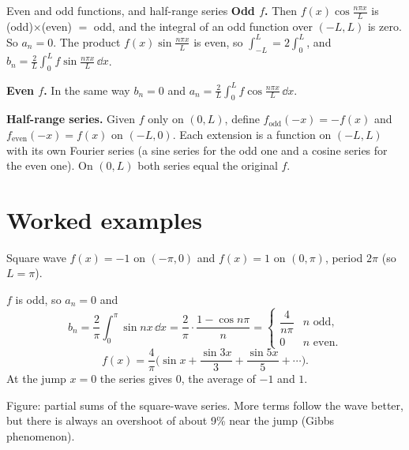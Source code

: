 \begin{derivbox}{Even and odd functions, and half-range series}
\textbf{Odd $f$.} Then $f(x)\cos\frac{n\pi x}{L}$ is (odd)$\times$(even) $=$ odd, and the integral of an odd function over $(-L,L)$ is zero. So $a_n = 0$. The product $f(x)\sin\frac{n\pi x}{L}$ is even, so $\int_{-L}^{L} = 2\int_0^L$, and $b_n = \frac2L\int_0^Lf\sin\frac{n\pi x}{L}\,\dd x$.

\textbf{Even $f$.} In the same way $b_n = 0$ and $a_n = \frac2L\int_0^Lf\cos\frac{n\pi x}{L}\,\dd x$.

\textbf{Half-range series.} Given $f$ only on $(0,L)$, define $f_{\text{odd}}(-x) = -f(x)$ and $f_{\text{even}}(-x) = f(x)$ on $(-L,0)$. Each extension is a function on $(-L,L)$ with its own Fourier series (a sine series for the odd one and a cosine series for the even one). On $(0,L)$ both series equal the original $f$.
\end{derivbox}

\section{Worked examples}

\begin{examplebox}{Square wave}
$f(x) = -1$ on $(-\pi, 0)$ and $f(x)=1$ on $(0,\pi)$, period $2\pi$ (so $L=\pi$).

$f$ is odd, so $a_n = 0$ and
\[ b_n = \frac2\pi\int_0^\pi \sin nx\,\dd x = \frac{2}{\pi}\cdot\frac{1 - \cos n\pi}{n} = \begin{cases}\dfrac{4}{n\pi} & n \text{ odd},\\[4pt] 0 & n\text{ even}.\end{cases} \]
\[ f(x) = \frac4\pi\Big(\sin x + \frac{\sin 3x}{3} + \frac{\sin 5x}{5} + \cdots\Big). \]
At the jump $x=0$ the series gives $0$, the average of $-1$ and $1$.
\end{examplebox}

\begin{center}

{\small Figure: partial sums of the square-wave series. More terms follow the wave better, but there is always an overshoot of about 9\% near the jump (Gibbs phenomenon).}
\end{center}

